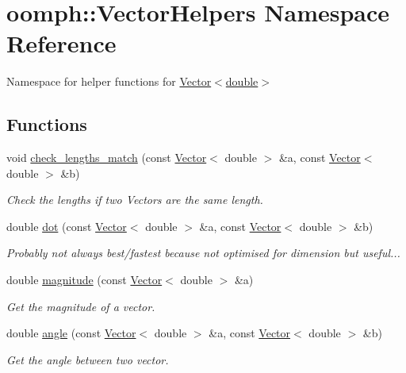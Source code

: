 \hypertarget{namespaceoomph_1_1VectorHelpers}{}\section{oomph\+:\+:Vector\+Helpers Namespace Reference}
\label{namespaceoomph_1_1VectorHelpers}


Namespace for helper functions for \hyperlink{classoomph_1_1Vector}{Vector$<$double$>$}  


\subsection*{Functions}
\begin{DoxyCompactItemize}
\item 
void \hyperlink{namespaceoomph_1_1VectorHelpers_adf5dc760c5f0c03365628b293544f838}{check\+\_\+lengths\+\_\+match} (const \hyperlink{classoomph_1_1Vector}{Vector}$<$ double $>$ \&a, const \hyperlink{classoomph_1_1Vector}{Vector}$<$ double $>$ \&b)
\begin{DoxyCompactList}\small\item\em Check the lengths if two Vectors are the same length. \end{DoxyCompactList}\item 
double \hyperlink{namespaceoomph_1_1VectorHelpers_a3df72a05fe435265c5b42dc232ff351c}{dot} (const \hyperlink{classoomph_1_1Vector}{Vector}$<$ double $>$ \&a, const \hyperlink{classoomph_1_1Vector}{Vector}$<$ double $>$ \&b)
\begin{DoxyCompactList}\small\item\em Probably not always best/fastest because not optimised for dimension but useful... \end{DoxyCompactList}\item 
double \hyperlink{namespaceoomph_1_1VectorHelpers_af92401cf726dc1712b7fb861b8416e69}{magnitude} (const \hyperlink{classoomph_1_1Vector}{Vector}$<$ double $>$ \&a)
\begin{DoxyCompactList}\small\item\em Get the magnitude of a vector. \end{DoxyCompactList}\item 
double \hyperlink{namespaceoomph_1_1VectorHelpers_aa1e3f6ce0472f978e750514448f8ca06}{angle} (const \hyperlink{classoomph_1_1Vector}{Vector}$<$ double $>$ \&a, const \hyperlink{classoomph_1_1Vector}{Vector}$<$ double $>$ \&b)
\begin{DoxyCompactList}\small\item\em Get the angle between two vector. \end{DoxyCompactList}\item 

\end{DoxyCompactItemize}

